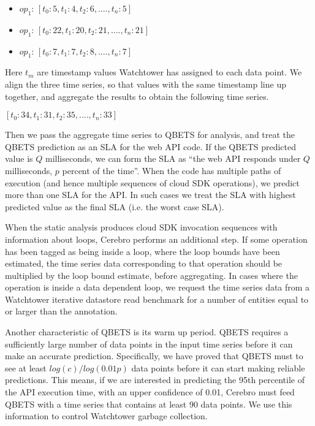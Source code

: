 \begin{itemize}
\item $op_{1}$: $[t_{0}: 5, t_{1}: 4, t_{2}: 6, ...., t_{n}: 5]$
\item $op_{1}$: $[t_{0}: 22, t_{1}: 20, t_{2}: 21, ...., t_{n}: 21]$
\item $op_{1}$: $[t_{0}: 7, t_{1}: 7, t_{2}: 8, ...., t_{n}: 7]$
\end{itemize}

Here $t_{m}$ are timestamp values Watchtower has assigned to 
each data point. We align the three
time series, so that values with the same timestamp line up 
together, and aggregate the results
to obtain the following time series.

$[t_{0}: 34, t_{1}: 31, t_{2}: 35, ...., t_{n}: 33]$

Then we pass the aggregate time series to QBETS for analysis, and
treat the QBETS prediction as an SLA for the web API code.
If the QBETS predicted value is $Q$ milliseconds, 
we can form the SLA as ``the web API responds 
under $Q$ milliseconds, $p$ percent of the time''. 
When the code has multiple paths of execution (and
hence multiple sequences of cloud SDK operations), 
we predict more than one SLA for the API. In
such cases we treat the SLA with highest predicted value 
as the final SLA (i.e. the worst case SLA).

When the static analysis produces cloud SDK invocation 
sequences with information about loops, Cerebro performs an additional step.
If some operation has been tagged as being inside a loop, where the loop
bounds have been estimated, the time series data corresponding to that 
operation should be multiplied 
by the loop bound estimate, before aggregating. In cases where the operation 
is inside a data dependent loop, we request the time series data from a 
Watchtower iterative datastore read benchmark for a number of entities 
equal to or larger than the annotation. 

Another characteristic of QBETS is its warm up period.
QBETS requires a sufficiently large number of data points
in the input time series before it can make an accurate prediction. 
Specifically, we have proved that QBETS must to see 
at least $log(c)/log(0.01p)$ data points
before it can start making reliable predictions. 
This means, if we are interested in predicting the 95th percentile
of the API execution time, with an upper confidence of 0.01, 
Cerebro must feed QBETS with a time series that
contains at least 90 data points. We use this information to control 
Watchtower garbage collection.

